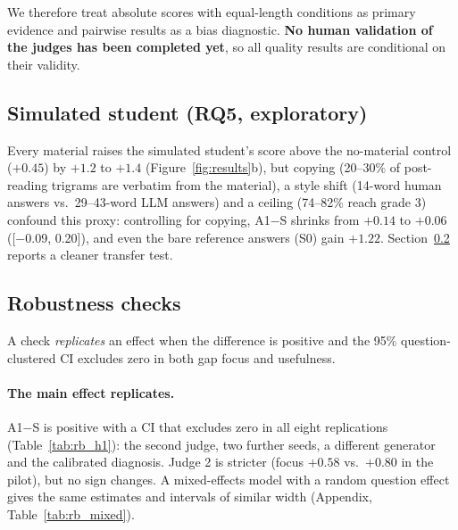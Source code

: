\documentclass[11pt]{article}
\begin{document}
We therefore treat absolute scores with equal-length conditions as primary evidence and pairwise results as a bias diagnostic. \textbf{No human validation of the judges has been completed yet}, so all quality results are conditional on their validity.

\subsection{Simulated student (RQ5, exploratory)}
Every material raises the simulated student's score above the no-material control ($+0.45$) by $+1.2$ to $+1.4$ (Figure~\ref{fig:results}b), but copying (20--30\% of post-reading trigrams are verbatim from the material), a style shift (14-word human answers vs.\ 29--43-word LLM answers) and a ceiling (74--82\% reach grade 3) confound this proxy: controlling for copying, A1$-$S shrinks from $+0.14$ to $+0.06$ ([$-$0.09, 0.20]), and even the bare reference answers (S0) gain $+1.22$. Section~\ref{sec:robust} reports a cleaner transfer test.

\subsection{Robustness checks}
\label{sec:robust}
A check \emph{replicates} an effect when the difference is positive and the 95\% question-clustered CI excludes zero in both gap focus and usefulness.

\paragraph{The main effect replicates.} A1$-$S is positive with a CI that excludes zero in all eight replications (Table~\ref{tab:rb_h1}): the second judge, two further seeds, a different generator and the calibrated diagnosis. Judge 2 is stricter (focus $+0.58$ vs.\ $+0.80$ in the pilot), but no sign changes. A mixed-effects model with a random question effect gives the same estimates and intervals of similar width (Appendix, Table~\ref{tab:rb_mixed}).

\begin{table}[t]
\centering\footnotesize
\resizebox{\columnwidth}{!}{}
\caption{A1$-$S (judge scores, 1--5) in each replication of the pilot; 95\% question-clustered CIs; all intervals exclude zero.}
\label{tab:rb_h1}
\end{table}
\end{document}
